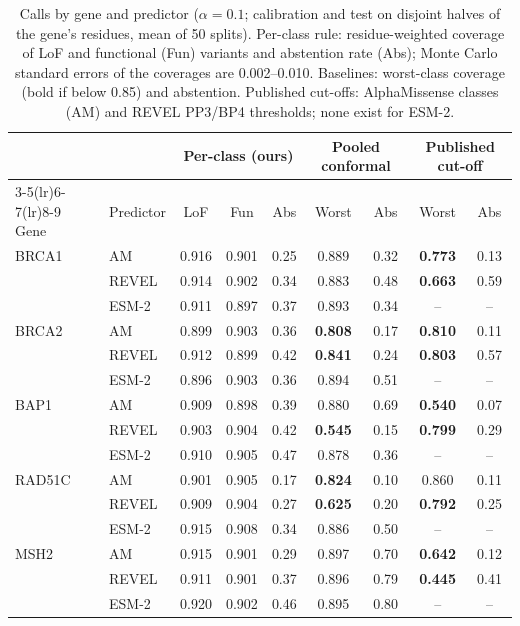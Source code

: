 \begin{table}[t]
\centering
\caption{Calls by gene and predictor ($\alpha=0.1$; calibration and test on disjoint halves of the gene's residues, mean
of 50 splits). Per-class rule: residue-weighted coverage of LoF and functional (Fun) variants and abstention rate (Abs);
Monte Carlo standard errors of the coverages are 0.002--0.010. Baselines: worst-class
coverage (bold if below 0.85) and abstention. Published cut-offs: AlphaMissense classes (AM) and REVEL PP3/BP4
thresholds; none exist for ESM-2.}\label{tab:main}
\setlength{\tabcolsep}{4pt}
\begin{tabular}{llccccccc}
\toprule
 & & \multicolumn{3}{c}{Per-class (ours)} & \multicolumn{2}{c}{Pooled conformal} & \multicolumn{2}{c}{Published cut-off}\\
\cmidrule(lr){3-5}\cmidrule(lr){6-7}\cmidrule(lr){8-9}
Gene & Predictor & LoF & Fun & Abs & Worst & Abs & Worst & Abs\\
\midrule
BRCA1 & AM & 0.916 & 0.901 & 0.25 & 0.889 & 0.32 & \textbf{0.773} & 0.13 \\
 & REVEL & 0.914 & 0.902 & 0.34 & 0.883 & 0.48 & \textbf{0.663} & 0.59 \\
 & ESM-2 & 0.911 & 0.897 & 0.37 & 0.893 & 0.34 & -- & -- \\
\addlinespace[1pt]
BRCA2 & AM & 0.899 & 0.903 & 0.36 & \textbf{0.808} & 0.17 & \textbf{0.810} & 0.11 \\
 & REVEL & 0.912 & 0.899 & 0.42 & \textbf{0.841} & 0.24 & \textbf{0.803} & 0.57 \\
 & ESM-2 & 0.896 & 0.903 & 0.36 & 0.894 & 0.51 & -- & -- \\
\addlinespace[1pt]
BAP1 & AM & 0.909 & 0.898 & 0.39 & 0.880 & 0.69 & \textbf{0.540} & 0.07 \\
 & REVEL & 0.903 & 0.904 & 0.42 & \textbf{0.545} & 0.15 & \textbf{0.799} & 0.29 \\
 & ESM-2 & 0.910 & 0.905 & 0.47 & 0.878 & 0.36 & -- & -- \\
\addlinespace[1pt]
RAD51C & AM & 0.901 & 0.905 & 0.17 & \textbf{0.824} & 0.10 & 0.860 & 0.11 \\
 & REVEL & 0.909 & 0.904 & 0.27 & \textbf{0.625} & 0.20 & \textbf{0.792} & 0.25 \\
 & ESM-2 & 0.915 & 0.908 & 0.34 & 0.886 & 0.50 & -- & -- \\
\addlinespace[1pt]
MSH2 & AM & 0.915 & 0.901 & 0.29 & 0.897 & 0.70 & \textbf{0.642} & 0.12 \\
 & REVEL & 0.911 & 0.901 & 0.37 & 0.896 & 0.79 & \textbf{0.445} & 0.41 \\
 & ESM-2 & 0.920 & 0.902 & 0.46 & 0.895 & 0.80 & -- & -- \\
\bottomrule
\end{tabular}
\end{table}
